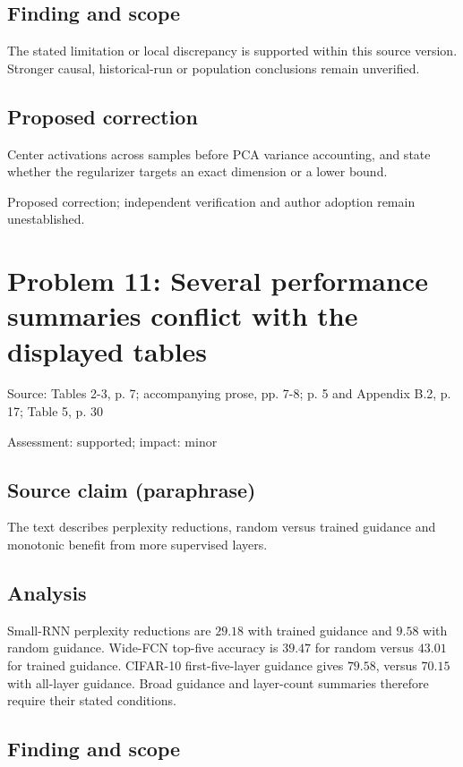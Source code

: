 \documentclass[11pt]{article}
\begin{document}
\subsection*{Finding and scope}

The stated limitation or local discrepancy is supported within this source version. Stronger causal, historical-run or population conclusions remain unverified.

\subsection*{Proposed correction}

Center activations across samples before PCA variance accounting, and state whether the regularizer targets an exact dimension or a lower bound.

Proposed correction; independent verification and author adoption remain unestablished.

\section*{Problem 11: Several performance summaries conflict with the displayed tables}

Source: Tables 2-3, p. 7; accompanying prose, pp. 7-8; p. 5 and Appendix B.2, p. 17; Table 5, p. 30

Assessment: supported; impact: minor

\subsection*{Source claim (paraphrase)}

The text describes perplexity reductions, random versus trained guidance and monotonic benefit from more supervised layers.

\subsection*{Analysis}

Small-RNN perplexity reductions are \(29.18\) with trained guidance and \(9.58\) with random guidance. Wide-FCN top-five accuracy is \(39.47\) for random versus \(43.01\) for trained guidance. CIFAR-10 first-five-layer guidance gives \(79.58\), versus \(70.15\) with all-layer guidance. Broad guidance and layer-count summaries therefore require their stated conditions.

\subsection*{Finding and scope}
\end{document}
